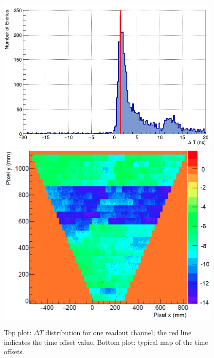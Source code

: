 \documentclass[5p,times,twocolumn]{elsarticle}
\begin{document}
\begin{figure}[t]
\begin{center}
\includegraphics[width=0.9\columnwidth]{Toffset_ch2913.png}
\includegraphics[width=0.95\columnwidth]{Offset_map.png}
\end{center}
\caption{Top plot: $\Delta T$ distribution for one readout channel; the red line indicates the time offset value.
  Bottom plot: typical map of the time offsets.}
\label{fig:Toffset}
\end{figure}
\end{document}
